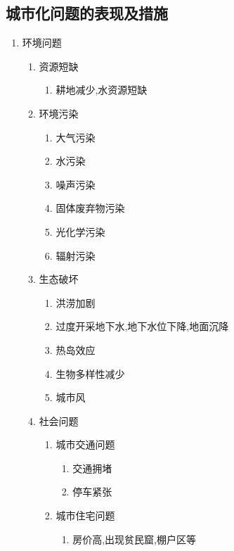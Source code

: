 \documentclass[a4paper]{article}
\begin{document}
    \subsection{城市化问题的表现及措施}
    \begin{enumerate}
        \item 环境问题
        \begin{enumerate}
            \item 资源短缺
            \begin{enumerate}
                \item 耕地减少,水资源短缺
            \end{enumerate}
            \item 环境污染
            \begin{enumerate}
                \item 大气污染
                \item 水污染
                \item 噪声污染
                \item 固体废弃物污染
                \item 光化学污染
                \item 辐射污染
            \end{enumerate}
            \item 生态破坏
            \begin{enumerate}
                \item 洪涝加剧
                \item 过度开采地下水,地下水位下降,地面沉降
                \item 热岛效应
                \item 生物多样性减少
                \item 城市风
            \end{enumerate}
            \item 社会问题
            \begin{enumerate}
                \item 城市交通问题
                \begin{enumerate}
                    \item 交通拥堵
                    \item 停车紧张
                \end{enumerate}
                \item 城市住宅问题
                \begin{enumerate}
                    \item 房价高,出现贫民窟,棚户区等

\end{enumerate}
\end{enumerate}
\end{enumerate}
\end{enumerate}
\end{document}
